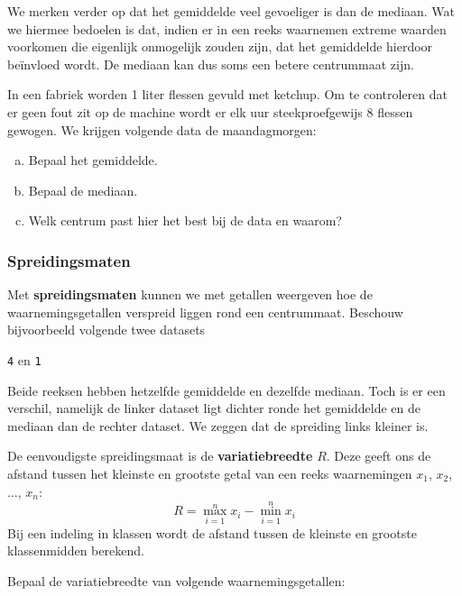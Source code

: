 \documentclass[12pt,twoside,a4paper]{article}
\begin{document}
We merken verder op dat het gemiddelde veel gevoeliger is dan de mediaan. Wat we hiermee bedoelen is dat, indien er in een reeks waarnemen extreme waarden voorkomen die eigenlijk onmogelijk zouden zijn, dat het gemiddelde hierdoor beïnvloed wordt. De mediaan kan dus soms een betere centrummaat zijn.

\begin{oefening}
In een fabriek worden 1 liter flessen gevuld met ketchup. Om te controleren dat er geen fout zit op de machine wordt er elk uur steekproefgewijs 8 flessen gewogen. We krijgen volgende data de maandagmorgen:
\begin{enumerate}[(a)]
  \item Bepaal het gemiddelde.
  \item Bepaal de mediaan.
  \item Welk centrum past hier het best bij de data en waarom?
\end{enumerate}
\end{oefening}

\subsubsection{Spreidingsmaten}

Met {\bf spreidingsmaten} kunnen we met getallen weergeven hoe de waarnemingsgetallen verspreid liggen rond een centrummaat. Beschouw bijvoorbeeld volgende twee datasets
\begin{center}
  \texttt{4} \qquad\qquad en \qquad\qquad \texttt{1}
\end{center}
Beide reeksen hebben hetzelfde gemiddelde en dezelfde mediaan. Toch is er een verschil, namelijk de linker dataset ligt dichter ronde het gemiddelde en de mediaan dan de rechter dataset. We zeggen dat de spreiding links kleiner is.

De eenvoudigste spreidingsmaat is de {\bf variatiebreedte} $R$. Deze geeft ons de afstand tussen het kleinste en grootste getal van een reeks waarnemingen $x_1$, $x_2$, $\ldots$, $x_n$:
$$R=\max_{i=1}^n x_i - \min_{i=1}^n x_i $$
Bij een indeling in klassen wordt de afstand tussen de kleinste en grootste klassenmidden berekend.

\begin{oefening}
Bepaal de variatiebreedte van volgende waarnemingsgetallen:
\begin{center}
\end{center}
\end{oefening}
\end{document}
